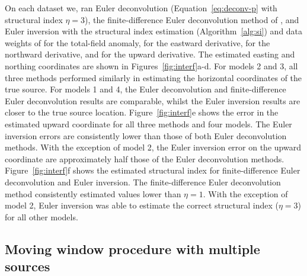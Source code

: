 On each dataset we, ran Euler deconvolution (Equation~\ref{eq:deconv-p} with structural index $\eta=3$), the finite-difference Euler deconvolution method of \citet{Gerovska2005}, and Euler inversion with the structural index estimation (Algorithm~\ref{alg:si}) and data weights of \DefaultWeightsF{} for the total-field anomaly, \DefaultWeightsE{} for the eastward derivative, \DefaultWeightsN{} for the northward derivative, and \DefaultWeightsU{} for the upward derivative.
The estimated easting and northing coordinates are shown in Figures~\ref{fig:interf}a-d.
For models 2 and 3, all three methods performed similarly in estimating the horizontal coordinates of the true source.
For models 1 and 4, the Euler deconvolution and finite-difference Euler deconvolution results are comparable, whilst the Euler inversion results are closer to the true source location.
Figure~\ref{fig:interf}e shows the error in the estimated upward coordinate for all three methods and four models.
The Euler inversion errors are consistently lower than those of both Euler deconvolution methods.
With the exception of model 2, the Euler inversion error on the upward coordinate are approximately half those of the Euler deconvolution methods.
Figure~\ref{fig:interf}f shows the estimated structural index for finite-difference Euler deconvolution and Euler inversion.
The finite-difference Euler deconvolution method consistently estimated values lower than $\eta=1$.
With the exception of model 2, Euler inversion was able to estimate the correct structural index ($\eta=3$) for all other models.


\subsection{Moving window procedure with multiple sources}
\label{sec:windows}

